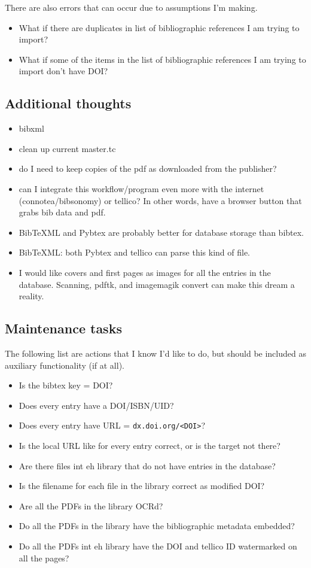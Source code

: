 \documentclass[letterpaper,12pt]{article}
\begin{document}
There are also errors that can occur due to assumptions I'm making.

\begin{itemize}
\item What if there are duplicates in list of bibliographic references I am trying to import?
\item What if some of the items in the list of bibliographic references I am trying to import don't have DOI?
\end{itemize}

\subsection{Additional thoughts}

\begin{itemize}
\item bibxml
\item clean up current master.tc
\item do I need to keep copies of the pdf as downloaded from the publisher?
\item can I integrate this workflow/program even more with the internet (connotea/bibsonomy) or tellico? In other words, have a browser button that grabs bib data and pdf.
\item BibTeXML and Pybtex are probably better for database storage than bibtex.
\item BibTeXML: both Pybtex and tellico can parse this kind of file.
\item I would like covers and first pages as images for all the entries in the database. Scanning, pdftk, and imagemagik convert can make this dream a reality.
\end{itemize}

\subsection{Maintenance tasks}
The following list are actions that I know I'd like to do, but should be included as auxiliary functionality (if at all).

\begin{itemize}
\item Is the bibtex key = DOI?
\item Does every entry have a DOI/ISBN/UID?
\item Does every entry have URL = \verb|dx.doi.org/<DOI>|?
\item Is the local URL like for every entry correct, or is the target not there?
\item Are there files int eh library that do not have entries in the database?
\item Is the filename for each file in the library correct as modified DOI?
\item Are all the PDFs in the library OCRd?
\item Do all the PDFs in the library have the bibliographic metadata embedded?
\item Do all the PDFs int eh library have the DOI and tellico ID watermarked on all the pages?
\end{itemize}
\end{document}
